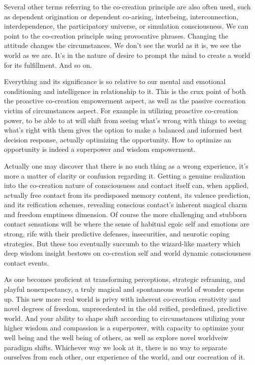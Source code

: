 \documentclass[12pt,openany]{book}
\begin{document}
Several other terms referring to the co-creation principle are also often used, such as dependent origination or dependent co-arising, interbeing, interconnection, interdependence, the participatory universe, or simulation consciousness. We can point to the co-creation principle using provocative phrases. Changing the attitude changes the circumstances. We don’t see the world as it is, we see the world as we are. It’s in the nature of desire to prompt the mind to create a world for its fulfillment. And so on.

Everything and its significance is so relative to our mental and emotional conditioning and intelligence in relationship to it. This is the crux point of both the proactive co-creation empowerment aspect, as well as the passive cocreation victim of circumstances aspect. For example in utilizing proactive co-creation power, to be able to at will shift from seeing what’s wrong with things to seeing what’s right with them gives the option to make a balanced and informed best decision response, actually optimizing the opportunity. How to optimize an opportunity is indeed a superpo\-wer and wisdom empowerment.

Actually one may discover that there is no such thing as a wrong experience, it’s more a matter of clarity or confusion regarding it. Getting a genuine realization into the co-creation nature of consciousness and contact itself can, when applied, actually free contact from its predisposed memory content, its valence prediction, and its reification schemes, revealing conscious contact's inherent magical \linebreak charm and freedom emptiness dimension. Of course the more challenging and stubborn contact sensations will be where the sense of habitual egoic self and emotions are strong, rife with their predictive defenses, insecurities, and neurotic coping strategies. But these too eventually succumb to the wizard-like mastery which deep wisdom insight bestows on co-creation self and world dynamic consciousness contact events.

As one becomes proficient at transforming perceptions, strategic reframing, and playful nonexpectancy, a truly magical and spontaneous world of wonder opens up. This new more real world is privy with inherent co-creation creativity and novel degrees of freedom, unprecedented in the old reified, predefined, predictive world. And your ability to shape shift according to circumstances utilizing your higher wisdom and compassion is a superpower, with capacity to optimize your well being and the well being of others, as well as explore novel worldveiw paradigm shifts. Whichever way we look at it, there is no way to separate ourselves from each other, our experience of the world, and our cocreation of it.
\end{document}
